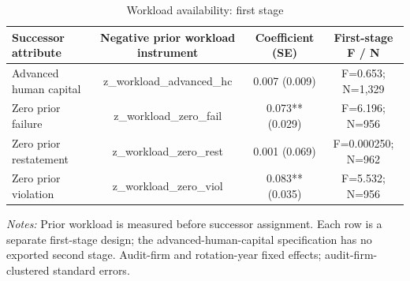 \begin{table}[htbp]
\footnotesize
\centering
\caption{Workload availability: first stage}
\begin{threeparttable}
\begin{tabular}{p{}ccc}
\toprule
Successor attribute & Negative prior workload instrument & Coefficient (SE) & First-stage F / N \\
\midrule
Advanced human capital & z\_workload\_advanced\_hc & 0.007 (0.009) & F=0.653; N=1,329 \\
Zero prior failure & z\_workload\_zero\_fail & 0.073** (0.029) & F=6.196; N=956 \\
Zero prior restatement & z\_workload\_zero\_rest & 0.001 (0.069) & F=0.000250; N=962 \\
Zero prior violation & z\_workload\_zero\_viol & 0.083** (0.035) & F=5.532; N=956 \\
\bottomrule
\end{tabular}
\begin{tablenotes}\footnotesize
\item \raggedright \textit{Notes:} Prior workload is measured before successor assignment. Each row is a separate first-stage design; the advanced-human-capital specification has no exported second stage. Audit-firm and rotation-year fixed effects; audit-firm-clustered standard errors.
\end{tablenotes}
\end{threeparttable}
\end{table}
